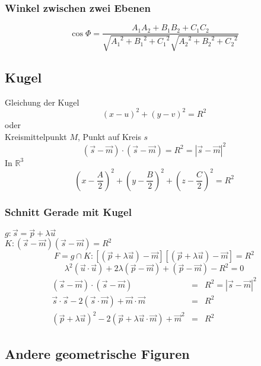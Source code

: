 \documentclass{report}
\begin{document}
\subsubsection{Winkel zwischen zwei Ebenen}
\begin{equation}\cos{\Phi} = \frac{A_1A_2+B_1B_2+C_1C_2}{\sqrt{{A_1}^2+{B_1}^2+{C_1}^2}\sqrt{{A_2}^2+{B_2}^2+{C_2}^2}}\end{equation}
\subsection{Kugel}
Gleichung der Kugel
\begin{equation}(x-u)^2+(y-v)^2=R^2\end{equation}
oder\\
Kreismittelpunkt $M$, Punkt auf Kreis $s$
\begin{equation}(\vec{s}-\vec{m}) \cdot (\vec{s} - \vec{m}) = R^2 = |\vec{s}-\vec{m}|^2\end{equation}
In $\mathbb{R}^3$
\begin{equation}(x-\frac{A}{2})^2+(y-\frac{B}{2})^2+(z-\frac{C}{2})^2=R^2\end{equation}
\subsubsection{Schnitt Gerade mit Kugel}
$g: \vec{s} = \vec{p} + \lambda \vec{u}$\\
$K: (\vec{s}-\vec{m})(\vec{s}-\vec{m}) = R^2$\\
\begin{equation}F = g \cap K: [(\vec{p} + \lambda \vec{u})-\vec{m}][(\vec{p} + \lambda \vec{u})-\vec{m}]=R^2\end{equation}
\begin{equation}\lambda^2(\vec{u} \cdot \vec{u})+2 \lambda (\vec{p}-\vec{m}) + (\vec{p}-\vec{m}) - R^2 = 0\end{equation}
\begin{eqnarray}(\vec{s}-\vec{m}) \cdot (\vec{s} - \vec{m}) & = & R^2 = |\vec{s}-\vec{m}|^2  \\
\vec{s} \cdot \vec{s} - 2 (\vec{s} \cdot \vec{m}) + \vec{m} \cdot \vec{m} & = & R^2\\
(\vec{p} + \lambda \vec{u})^2 - 2 (\vec{p} + \lambda \vec{u} \cdot \vec{m}) + \vec{m}^2 & = & R^2\end{eqnarray}
\subsection{Andere geometrische Figuren}
\end{document}
